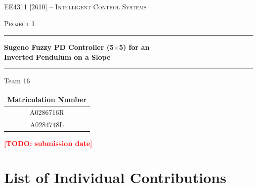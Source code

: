 \documentclass[11pt,a4paper]{article}
\newcommand{\todo}[1]{\textcolor{red}{\textbf{[TODO: #1]}}}
\begin{document}
\begin{titlepage}
\centering
\vspace*{2cm}

{\scshape\large EE4311 [2610] -- Intelligent Control Systems\par}
\vspace{0.5cm}
{\scshape\large Project 1\par}

\vspace{2cm}
\rule{\textwidth}{1pt}
\vspace{0.5cm}
{\huge\bfseries Sugeno Fuzzy PD Controller (5$\times$5) for an\\[0.3em]
Inverted Pendulum on a Slope\par}
\vspace{0.5cm}
\rule{\textwidth}{1pt}

\vspace{3cm}
{\large Team 16\par}
\vspace{0.5cm}

\begin{tabular}{c}
\toprule
Matriculation Number \\
\midrule
A0286716R \\
A0284748L \\
\bottomrule
\end{tabular}

\vfill
{\large \todo{submission date}\par}
\end{titlepage}

\clearpage
\tableofcontents
\clearpage

\section*{List of Individual Contributions}
\end{document}
